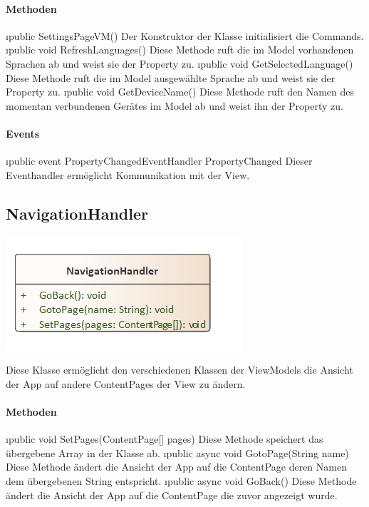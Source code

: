 \documentclass[../entwurf.tex]{subfiles}
\begin{document}
\paragraph{Methoden}
\begin{itemize}
	\i{public SettingsPageVM()} Der Konstruktor der Klasse initialisiert die Commands.
	\i{public void RefreshLanguages()} Diese Methode ruft die im Model vorhandenen Sprachen ab und weist sie der Property  zu.
	\i{public void GetSelectedLanguage()} Diese Methode ruft die im Model ausgewählte Sprache ab und weist sie der Property  zu.
	\i{public void GetDeviceName()} Diese Methode ruft den Namen des momentan verbundenen Gerätes im Model ab und weist ihn der Property  zu.
\end{itemize}
\paragraph{Events}
\begin{itemize}
	\i{public event PropertyChangedEventHandler PropertyChanged} Dieser Eventhandler ermöglicht Kommunikation mit der View.
\end{itemize}
\subsection{NavigationHandler}
\begin{minipage}{0.45\textwidth}
\includegraphics[scale=0.75]{../graphics/vm_klassen/NavigationHandler.png}
\end{minipage}
\begin{minipage}{0.55\textwidth}
Diese Klasse ermöglicht den verschiedenen Klassen der ViewModels die Ansicht der App auf andere ContentPages der View zu ändern.
\end{minipage}
\paragraph{Methoden}
\begin{itemize}
	\i{public void SetPages(ContentPage[] pages)} Diese Methode speichert das übergebene Array in der Klasse ab.
	\i{public async void GotoPage(String name)} Diese Methode ändert die Ansicht der App auf die ContentPage deren Namen dem übergebenen String entspricht.
	\i{public async void GoBack()} Diese Methode ändert die Ansicht der App auf die ContentPage die zuvor angezeigt wurde.
\end{itemize}
\end{document}
